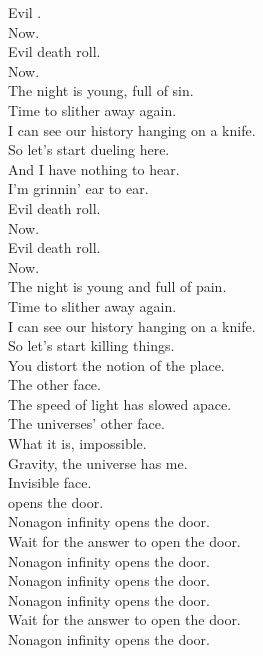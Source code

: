 Evil . \\
Now. \\
Evil death roll. \\
Now. \\

The night is young, full of sin. \\
Time to slither away again. \\
I can see our history hanging on a knife. \\

So let's start dueling here. \\
And I have nothing to hear. \\
I'm grinnin' ear to ear. \\

Evil death roll. \\
Now. \\
Evil death roll. \\
Now. \\

The night is young and full of pain. \\
Time to slither away again. \\
I can see our history hanging on a knife. \\
So let's start killing things. \\

You distort the notion of the place. \\
The  other face. \\
The speed of light has slowed apace. \\
The universes' other face. \\

What it is, impossible. \\
Gravity, the universe has me. \\
Invisible face. \\

 opens the door. \\
Nonagon infinity opens the door. \\
Wait for the answer to open the door. \\
Nonagon infinity opens the door. \\

Nonagon infinity opens the door. \\
Nonagon infinity opens the door. \\
Wait for the answer to open the door. \\
Nonagon infinity opens the door. \\

